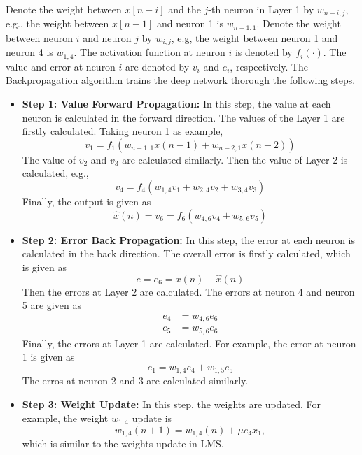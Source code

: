 \documentclass[10pt]{article}
\begin{document}
Denote the weight between $x[n-i]$ and the $j$-th neuron in Layer 1 by $w_{n-i,j}$,
e.g., the weight between $x[n-1]$ and neuron 1 is $w_{n-1,1}$. Denote the weight between 
neuron $i$ and neuron $j$ by $w_{i,j}$, e.g, the weight between neuron 1 and neuron 4 is $w_{1,4}$. 
The activation function at neuron $i$ is denoted by $f_i(\cdot)$. The value and error
at neuron $i$ are denoted by $v_i$ and $e_i$, respectively. 
The Backpropagation algorithm trains the deep network thorough the following steps.
\begin{itemize}
	\item \textbf{Step 1: Value Forward Propagation:}
	In this step, the value at each neuron is calculated in the forward direction.
	The values of the Layer 1 are firstly calculated. Taking neuron 1 as example,
	\begin{equation}
		v_1 = f_1 ( w_{n-1,1} x(n-1) + w_{n-2,1} x(n-2))
	\end{equation}
	The value of $v_2$ and $v_3$ are calculated similarly.
	Then the value of Layer 2 is calculated, e.g.,
	\begin{equation}
		v_4 = f_4 ( w_{1,4} v_1 + w_{2,4} v_2 + w_{3,4} v_3)
	\end{equation}
	Finally, the output is given as
	\begin{equation}
		\hat{x}(n) = v_6 = f_6 ( w_{4,6} v_4 + w_{5,6} v_5 )
	\end{equation}
	\item \textbf{Step 2: Error Back Propagation:}
	In this step, the error at each neuron is calculated in the back direction.
	The overall error is firstly calculated, which is given as
	\begin{equation}
		e = e_6 = x(n) - \hat{x}(n)
	\end{equation}
	Then the errors at Layer 2 are calculated. 
	The errors at neuron 4 and neuron 5 are given as
	\begin{align}
		e_4 &= w_{4,6} e_6 \\
		e_5 &= w_{5,6} e_6
	\end{align}
	Finally, the errors at Layer 1 are calculated. For example,
	the error at neuron 1 is given as 
	\begin{equation}
		e_1 = w_{1,4} e_4 + w_{1,5} e_5
	\end{equation}
	The erros at neuron 2 and 3 are calculated similarly.
	\item \textbf{Step 3: Weight Update:}
	In this step, the weights are updated. For example, the weight $w_{1,4}$ update is 
	\begin{equation}
		w_{1,4}(n+1) = w_{1,4}(n) + \mu e_4 x_1,
	\end{equation}
	which is similar to the weights update in LMS.
\end{itemize}
\end{document}
